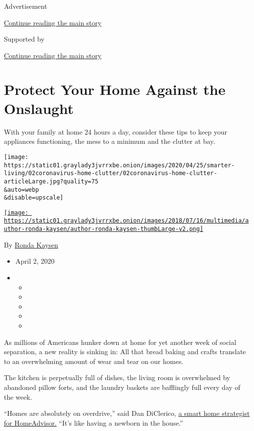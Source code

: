 Advertisement

\protect\hyperlink{after-top}{Continue reading the main story}

Supported by

\protect\hyperlink{after-sponsor}{Continue reading the main story}

\hypertarget{protect-your-home-against-the-onslaught}{%
\section{Protect Your Home Against the
Onslaught}\label{protect-your-home-against-the-onslaught}}

With your family at home 24 hours a day, consider these tips to keep
your appliances functioning, the mess to a minimum and the clutter at
bay.

\texttt{[image: https://static01.graylady3jvrrxbe.onion/images/2020/04/25/smarter-living/02coronavirus-home-clutter/02coronavirus-home-clutter-articleLarge.jpg?quality=75\\\&auto=webp\\\&disable=upscale]}

\href{https://www.nytimes3xbfgragh.onion/by/ronda-kaysen}{\texttt{[image: https://static01.graylady3jvrrxbe.onion/images/2018/07/16/multimedia/author-ronda-kaysen/author-ronda-kaysen-thumbLarge-v2.png]}}

By \href{https://www.nytimes3xbfgragh.onion/by/ronda-kaysen}{Ronda
Kaysen}

\begin{itemize}
\item
  April 2, 2020
\item
  \begin{itemize}
  \item
  \item
  \item
  \item
  \item
  \end{itemize}
\end{itemize}

As millions of Americans hunker down at home for yet another week of
social separation, a new reality is sinking in: All that bread baking
and crafts translate to an overwhelming amount of wear and tear on our
homes.

The kitchen is perpetually full of dishes, the living room is
overwhelmed by abandoned pillow forts, and the laundry baskets are
bafflingly full every day of the week.

``Homes are absolutely on overdrive,'' said Dan DiClerico,
\href{https://www.homeadvisor.com/r/about-dan-diclerico/}{a smart home
strategist for HomeAdvisor.} ``It's like having a newborn in the
house.''

